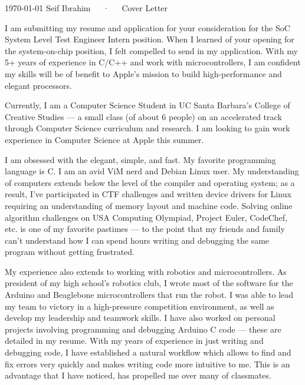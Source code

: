 \documentclass[11pt, letterpaper]{awesome-cv}
\begin{document}
\makecvheader[R]

\makecvfooter
  {\today}
  {Seif Ibrahim~~~·~~~Cover Letter}
  {\mbox{}}

  \makelettertitle

\begin{cvletter}

I am submitting my resume and application for your consideration for the SoC System Level Test Engineer Intern position. When I learned of your opening for the system-on-chip position, I felt compelled to send in my application. With my 5+ years of experience in C/C++ and work with microcontrollers, I am confident my skills will be of benefit to Apple's mission to build high-performance and elegant processors. 

Currently, I am a Computer Science Student in UC Santa Barbara's College of Creative Studies --- a small class (of about 6 people) on an accelerated track through Computer Science curriculum and research. I am looking to gain work experience in Computer Science at Apple this summer. 

I am obsessed with the elegant, simple, and fast. My favorite programming language is C. I am an avid ViM nerd and Debian Linux user. My understanding of computers extends below the level of the compiler and operating system; as a result, I've participated in CTF challenges and written device drivers for Linux requiring an understanding of memory layout and machine code. Solving online algorithm challenges on USA Computing Olympiad, Project Euler, CodeChef, etc. is one of my favorite pastimes --- to the point that my friends and family can't understand how I can spend hours writing and debugging the same program without getting frustrated. 

My experience also extends to working with robotics and microcontrollers. As president of my high school's robotics club, I wrote most of the software for the Arduino and Beaglebone microcontrollers that run the robot. I was able to lead my team to victory in a high-pressure competition environment, as well as develop my leadership and teamwork skills. I have also worked on personal projects involving programming and debugging Arduino C code --- these are detailed in my resume. With my years of experience in just writing and debugging code, I have established a natural workflow which allows to find and fix errors very quickly and makes writing code more intuitive to me. This is an advantage that I have noticed, has propelled me over many of classmates.


\end{cvletter}
\end{document}
